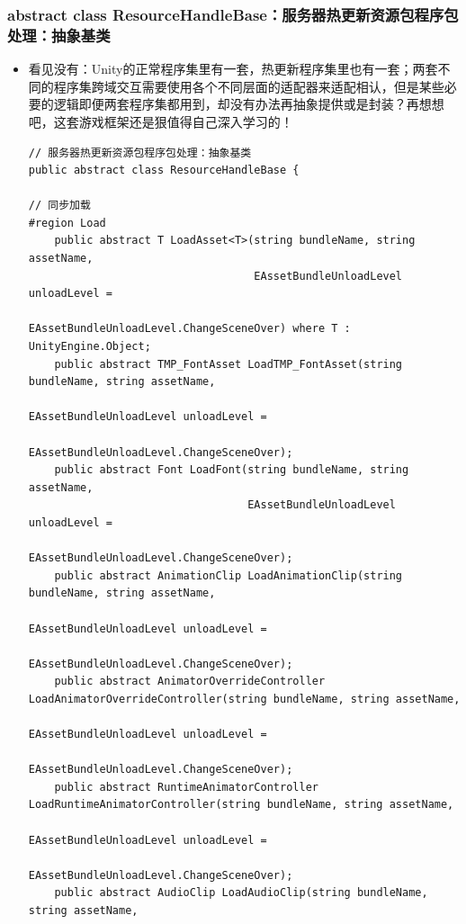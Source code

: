 \documentclass[9pt, b5paper]{article}
\begin{document}
\subsubsection{abstract class ResourceHandleBase：服务器热更新资源包程序包处理：抽象基类}
\label{sec-9-1-1}
\begin{itemize}
\item 看见没有：Unity的正常程序集里有一套，热更新程序集里也有一套；两套不同的程序集跨域交互需要使用各个不同层面的适配器来适配相认，但是某些必要的逻辑即便两套程序集都用到，却没有办法再抽象提供或是封装？再想想吧，这套游戏框架还是狠值得自己深入学习的！
\begin{verbatim}
// 服务器热更新资源包程序包处理：抽象基类
public abstract class ResourceHandleBase {

// 同步加载    
#region Load
    public abstract T LoadAsset<T>(string bundleName, string assetName, 
                                   EAssetBundleUnloadLevel unloadLevel = 
                                   EAssetBundleUnloadLevel.ChangeSceneOver) where T : UnityEngine.Object;
    public abstract TMP_FontAsset LoadTMP_FontAsset(string bundleName, string assetName, 
                                                    EAssetBundleUnloadLevel unloadLevel = 
                                                    EAssetBundleUnloadLevel.ChangeSceneOver);
    public abstract Font LoadFont(string bundleName, string assetName, 
                                  EAssetBundleUnloadLevel unloadLevel = 
                                  EAssetBundleUnloadLevel.ChangeSceneOver);
    public abstract AnimationClip LoadAnimationClip(string bundleName, string assetName, 
                                                    EAssetBundleUnloadLevel unloadLevel = 
                                                    EAssetBundleUnloadLevel.ChangeSceneOver);
    public abstract AnimatorOverrideController LoadAnimatorOverrideController(string bundleName, string assetName, 
                                                                              EAssetBundleUnloadLevel unloadLevel = 
                                                                              EAssetBundleUnloadLevel.ChangeSceneOver);
    public abstract RuntimeAnimatorController LoadRuntimeAnimatorController(string bundleName, string assetName, 
                                                                            EAssetBundleUnloadLevel unloadLevel = 
                                                                            EAssetBundleUnloadLevel.ChangeSceneOver);
    public abstract AudioClip LoadAudioClip(string bundleName, string assetName, 

\end{verbatim}
\end{itemize}
\end{document}
